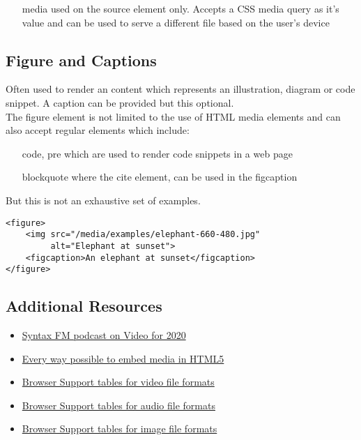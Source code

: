\begin{itemize}
    \item[media] used on the source element only. Accepts a CSS media query as it's value and can be used to serve a different file based on the user's device
\end{itemize}

\subsection{Figure and Captions}

Often used to render an content which represents an illustration, diagram or code snippet. A caption can be provided but this optional.
\\

The figure element is not limited to the use of HTML media elements and can also accept regular elements which include:

\begin{itemize}
    \item[code, pre] which are used to render code snippets in a web page
    \item[blockquote] where the cite element, can be used in the figcaption
\end{itemize}

But this is not an exhaustive set of examples.

\begin{verbatim}
<figure>
    <img src="/media/examples/elephant-660-480.jpg"
         alt="Elephant at sunset">
    <figcaption>An elephant at sunset</figcaption>
</figure>
\end{verbatim}

\subsection{Additional Resources}

\begin{itemize}[leftmargin=*]
    \item \href{https://syntax.fm/show/266/video-for-the-web-2020-and-beyond}{Syntax FM podcast on Video for 2020}
    \item \href{https://html.com/media/}{Every way possible to embed media in HTML5}
    \item \href{https://caniuse.com/?search=video%20format}{Browser Support tables for video file formats}
    \item \href{https://caniuse.com/?search=audio%20format}{Browser Support tables for audio file formats}
    \item \href{https://caniuse.com/?search=image%20format}{Browser Support tables for image file formats}
\end{itemize}